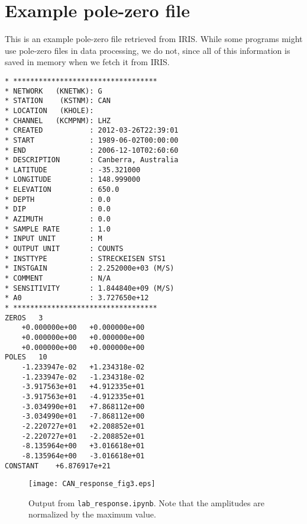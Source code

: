 \documentclass[11pt,titlepage,fleqn]{article}
\newcommand{\tfile}{{\tt lab\_response.ipynb}}
\begin{document}
\appendix

\section{Example pole-zero file}
\label{sec:pz}

This is an example pole-zero file retrieved from IRIS. While some programs might use pole-zero files in data processing, we do not, since all of this information is saved in memory when we fetch it from IRIS.

\small
\begin{spacing}{1.0}
\begin{verbatim}
* **********************************
* NETWORK   (KNETWK): G
* STATION    (KSTNM): CAN
* LOCATION   (KHOLE): 
* CHANNEL   (KCMPNM): LHZ
* CREATED           : 2012-03-26T22:39:01
* START             : 1989-06-02T00:00:00
* END               : 2006-12-10T02:60:60
* DESCRIPTION       : Canberra, Australia
* LATITUDE          : -35.321000
* LONGITUDE         : 148.999000 
* ELEVATION         : 650.0  
* DEPTH             : 0.0  
* DIP               : 0.0  
* AZIMUTH           : 0.0  
* SAMPLE RATE       : 1.0
* INPUT UNIT        : M
* OUTPUT UNIT       : COUNTS
* INSTTYPE          : STRECKEISEN STS1
* INSTGAIN          : 2.252000e+03 (M/S)
* COMMENT           : N/A
* SENSITIVITY       : 1.844840e+09 (M/S)
* A0                : 3.727650e+12
* **********************************
ZEROS	3
	+0.000000e+00	+0.000000e+00
	+0.000000e+00	+0.000000e+00
	+0.000000e+00	+0.000000e+00
POLES	10
	-1.233947e-02	+1.234318e-02
	-1.233947e-02	-1.234318e-02
	-3.917563e+01	+4.912335e+01
	-3.917563e+01	-4.912335e+01
	-3.034990e+01	+7.868112e+00
	-3.034990e+01	-7.868112e+00
	-2.220727e+01	+2.208852e+01
	-2.220727e+01	-2.208852e+01
	-8.135964e+00	+3.016618e+01
	-8.135964e+00	-3.016618e+01
CONSTANT	+6.876917e+21
\end{verbatim}
\end{spacing}
\normalsize



%


\begin{figure}
\centering
\texttt{[image: CAN\_response\_fig3.eps]}
\caption[]
{{
Output from \tfile.
Note that the amplitudes are normalized by the maximum value.
}}
\label{fig1}
\end{figure}
\end{document}
